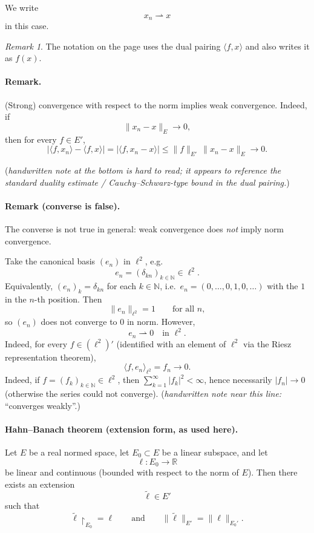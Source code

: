 \documentclass[11pt]{article}
\theoremstyle{definition}
\theoremstyle{remark}
\newtheorem{remark}{Remark}
\begin{document}
We write
\[
x_n \rightharpoonup x
\]
in this case.

\begin{remark}
The notation on the page uses the dual pairing $\langle f,x\rangle$ and also writes it as $f(x)$.
\end{remark}

\paragraph{Remark.}
(Strong) convergence with respect to the norm implies weak convergence. Indeed, if
\[
\|x_n-x\|_E \to 0,
\]
then for every $f\in E'$,
\[
\bigl|\langle f,x_n\rangle - \langle f,x\rangle\bigr|
=
\bigl|\langle f,x_n-x\rangle\bigr|
\le
\|f\|_{E'}\,\|x_n-x\|_E
\longrightarrow 0.
\]

\noindent
(\emph{handwritten note at the bottom is hard to read; it appears to reference the standard duality estimate / Cauchy--Schwarz-type bound in the dual pairing.})

\paragraph{Remark (converse is false).}
The converse is not true in general: weak convergence does \emph{not} imply norm convergence.

Take the canonical basis $(e_n)$ in $\ell^2$, e.g.
\[
e_n = (\delta_{kn})_{k\in\mathbb N}\in \ell^2.
\]
\noindent
Equivalently, $(e_n)_k=\delta_{kn}$ for each $k\in\mathbb N$, i.e.\ $e_n=(0,\dots,0,1,0,\dots)$ with the $1$ in the $n$-th position.
Then
\[
\|e_n\|_{\ell^2}=1 \qquad \text{for all } n,
\]
so $(e_n)$ does not converge to $0$ in norm. However,
\[
e_n \rightharpoonup 0 \quad \text{in }\ell^2.
\]
Indeed, for every $f\in (\ell^2)'$ (identified with an element of $\ell^2$ via the Riesz representation theorem),
\[
\langle f,e_n\rangle_{\ell^2} = f_n \longrightarrow 0.
\]
\noindent
Indeed, if $f=(f_k)_{k\in\mathbb{N}}\in \ell^2$, then $\sum_{k=1}^\infty |f_k|^2<\infty$, hence necessarily $|f_n|\to 0$ (otherwise the series could not converge).
\noindent
(\emph{handwritten note near this line:} ``converges weakly''.)

\paragraph{Hahn--Banach theorem (extension form, as used here).}
Let $E$ be a real normed space, let $E_0\subset E$ be a linear subspace, and let
\[
\ell \colon E_0 \to \mathbb R
\]
be linear and continuous (bounded with respect to the norm of $E$). Then there exists an extension
\[
\widetilde{\ell}\in E'
\]
such that
\[
\widetilde{\ell}\!\restriction_{E_0} = \ell
\qquad\text{and}\qquad
\|\widetilde{\ell}\|_{E'}=\|\ell\|_{E_0'}.
\]
\end{document}
